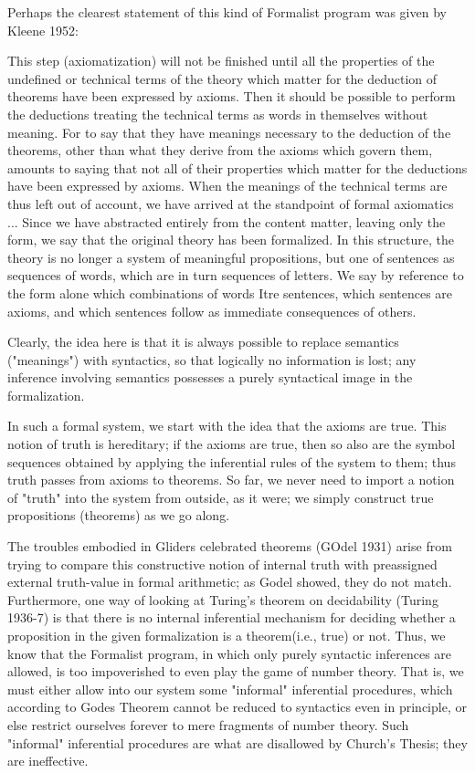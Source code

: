 \documentclass[a4paper,12pt]{article}
\begin{document}
Perhaps the clearest statement of this kind of Formalist program was given by Kleene 1952:

This step (axiomatization) will not be finished until all the properties of the
undefined or technical terms of the theory which matter for the deduction
of theorems have been expressed by axioms. Then it should be possible to
perform the deductions treating the technical terms as words in themselves
without meaning.  For to say that they have meanings necessary to the deduction
of the theorems, other than what they derive from the axioms which
govern them, amounts to saying that not all of their properties which matter
for the deductions have been expressed by axioms. When the meanings
of the technical terms are thus left out of account, we have arrived at the
standpoint of formal axiomatics ... Since we have abstracted entirely from
the content matter, leaving only the form, we say that the original theory has
been formalized. In this structure, the theory is no longer a system of meaningful
propositions, but one of sentences as sequences of words, which are
in turn sequences of letters.  We say by reference to the form alone which
combinations of words Itre sentences, which sentences are axioms, and which
sentences follow as immediate consequences of others.

Clearly, the idea here is that it is always possible to replace semantics ("meanings")
with syntactics, so that logically no information is lost; any inference involving semantics
possesses a purely syntactical image in the formalization.

In such a formal system, we start with the idea that the axioms are true.
This notion of truth is hereditary; if the axioms are true, then so also are the
symbol sequences obtained by applying the inferential rules of the system to them;
thus truth passes from axioms to theorems. So far, we never need to import a notion of "truth"
into the system from outside, as it were; we simply construct true propositions (theorems)
as we go along.

The troubles embodied in Gliders celebrated theorems (GOdel 1931)
arise from trying to compare this constructive notion of internal truth with
preassigned external truth-value in formal arithmetic; as Godel showed, they
do not match. Furthermore, one way of looking at Turing's theorem on decidability (Turing 1936-7)
is that there is no internal inferential mechanism for deciding whether a proposition
in the given formalization is a theorem(i.e., true) or not. Thus, we know that the Formalist program,
in which only purely syntactic inferences are allowed, is too impoverished to even play the game of number theory.
That is, we must either allow into our system some "informal" inferential procedures, which according to Godes Theorem
cannot be reduced to syntactics even in principle, or else restrict ourselves forever to mere fragments of number theory.
Such "informal" inferential procedures are what are disallowed by Church's Thesis; they are ineffective.
\end{document}
